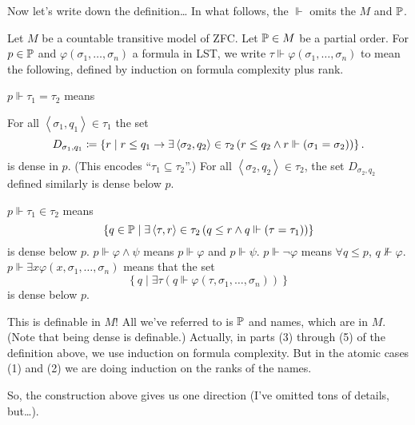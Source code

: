 Now let's write down the definition\dots
In what follows, the $\Vdash$ omits the $M$ and $\mathbb P$.
\begin{definition}
	Let $M$ be a countable transitive model of ZFC.
	Let $\mathbb P \in M$ be a partial order.
	For $p \in \mathbb P$ and $\varphi(\sigma_1, \dots, \sigma_n)$ a formula in LST, we write $\tau \Vdash \varphi(\sigma_1, \dots, \sigma_n)$ to mean the following, defined by induction on formula complexity plus rank.
	\begin{enumerate}[(1)]
		\ii $p \Vdash \tau_1 = \tau_2$ means
		\begin{enumerate}[(i)]
			\ii For all $\left<\sigma_1, q_1\right> \in \tau_1$ the set
			\[ D_{\sigma_1, q_1}
				\coloneqq
				\left\{ r \mid
				r \le q_1 \rightarrow \exists \left<\sigma_2, q_2\right> \in \tau_2 \left( r \le q_2 \land r \Vdash (\sigma_1 = \sigma_2) \right)\right\}.
			\]
			is dense in $p$.
			(This encodes ``$\tau_1 \subseteq \tau_2$''.)
			\ii For all $\left<\sigma_2, q_2\right> \in \tau_2$,
			the set $D_{\sigma_2, q_2}$ defined similarly is dense below $p$.
		\end{enumerate}
		\ii $p \Vdash \tau_1 \in \tau_2$ means
		\[
		\left\{ q \in \mathbb P
		\mid \exists \left<\tau, r\right> \in \tau_2 
		\left( q \le r \land q \Vdash(\tau=\tau_1) \right)
		\right\} \]
		is dense below $p$.
		\ii $p \Vdash \varphi \land \psi$ means $p \Vdash \varphi$ and $p \Vdash \psi$.
		\ii $p \Vdash \neg \varphi$ means $\forall q \le p$, $q \not\Vdash \varphi$.
		\ii $p \Vdash \exists x \varphi(x, \sigma_1, \dots, \sigma_n)$ means that the set
		\[
			\left\{ q \mid \exists \tau \left( q \Vdash
				\varphi(\tau, \sigma_1, \dots, \sigma_n ) \right)
			\right\}
		\]
		is dense below $p$.
	\end{enumerate}
\end{definition}
This is definable in $M$!
All we've referred to is $\mathbb P$ and names, which are in $M$.
(Note that being dense is definable.)
Actually, in parts (3) through (5) of the definition above,
we use induction on formula complexity.
But in the atomic cases (1) and (2) we are doing induction on the ranks of the names.

So, the construction above gives us one direction (I've omitted tons of details, but\dots).

